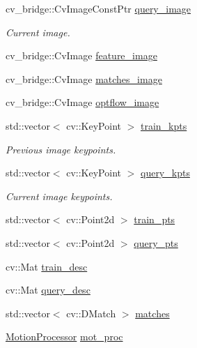 \begin{DoxyCompactItemize}
cv\-\_\-bridge\-::\-Cv\-Image\-Const\-Ptr \hyperlink{classLRM_1_1MonoOdometer_a1fbec0b090c10b1c542bd86f18795a14}{query\-\_\-image}
\begin{DoxyCompactList}\small\item\em \-Current image. \end{DoxyCompactList}\item 
cv\-\_\-bridge\-::\-Cv\-Image \hyperlink{classLRM_1_1MonoOdometer_a166844b373399a94d688234592ae8468}{feature\-\_\-image}
\item 
cv\-\_\-bridge\-::\-Cv\-Image \hyperlink{classLRM_1_1MonoOdometer_a1646743b51e5e0386def055e0265aaf2}{matches\-\_\-image}
\item 
cv\-\_\-bridge\-::\-Cv\-Image \hyperlink{classLRM_1_1MonoOdometer_a5f9b4ef57cf2b7d88bb92c8269a8792d}{optflow\-\_\-image}
\item 
std\-::vector$<$ cv\-::\-Key\-Point $>$ \hyperlink{classLRM_1_1MonoOdometer_a98515916ee97beaefb9bbcf07cd02d1b}{train\-\_\-kpts}
\begin{DoxyCompactList}\small\item\em \-Previous image keypoints. \end{DoxyCompactList}\item 
std\-::vector$<$ cv\-::\-Key\-Point $>$ \hyperlink{classLRM_1_1MonoOdometer_a18d64f992353bf50e1421a1cb9ca32f2}{query\-\_\-kpts}
\begin{DoxyCompactList}\small\item\em \-Current image keypoints. \end{DoxyCompactList}\item 
std\-::vector$<$ cv\-::\-Point2d $>$ \hyperlink{classLRM_1_1MonoOdometer_accbdc3f32cf2fb8e75f3f40cd8a4e60e}{train\-\_\-pts}
\item 
std\-::vector$<$ cv\-::\-Point2d $>$ \hyperlink{classLRM_1_1MonoOdometer_a4d269a8b3827580e73515e8f958e2283}{query\-\_\-pts}
\item 
cv\-::\-Mat \hyperlink{classLRM_1_1MonoOdometer_aae6c2096b1b0c785548bc57cf6557427}{train\-\_\-desc}
\item 
cv\-::\-Mat \hyperlink{classLRM_1_1MonoOdometer_a7bf26df30d6cebf7e6c5b85c2318ff51}{query\-\_\-desc}
\item 
std\-::vector$<$ cv\-::\-D\-Match $>$ \hyperlink{classLRM_1_1MonoOdometer_aefc5720615c86208707622253d2e08ed}{matches}
\item 
\hyperlink{classLRM_1_1MotionProcessor}{\-Motion\-Processor} \hyperlink{classLRM_1_1MonoOdometer_a91b2fd9ac3051a11e7008c2e3740a382}{mot\-\_\-proc}
\item 

\end{DoxyCompactItemize}
